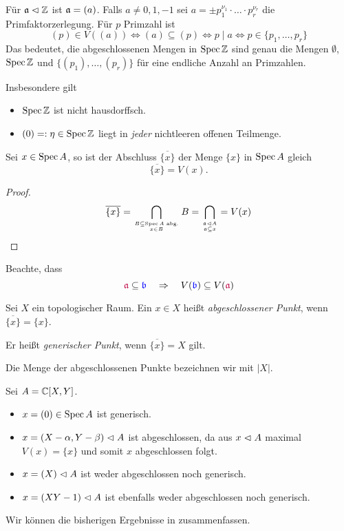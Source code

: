 \begin{beispiel}[$\Spec \Z$]
	Für $\mathfrak{a} \vartriangleleft \mathbb{Z}$ ist $\mathfrak{a} = (a)$. Falls $a \neq 0,1,-1$ sei
	$a = \pm p_1^{\nu_1} \cdot \dots \cdot p_r^{\nu_r}$ die 
	Primfaktorzerlegung. Für $p$ Primzahl ist
	\[
		(p) \in V((a)) \Leftrightarrow
		(a) \subseteq (p) \Leftrightarrow
		p \mid a \Leftrightarrow
		p \in \{p_1,\ldots, p_r\}
	\]
	Das bedeutet, die abgeschlossenen Mengen in $\Spec \Z$ sind genau die 
	Mengen $\emptyset$, $\Spec \Z$ und
	$\{(p_1), \ldots, (p_r)\}$ für eine endliche Anzahl an Primzahlen.
	
	Insbesondere gilt
	\begin{itemize}
	  \item $\Spec\Z$ ist nicht hausdorffsch.
	  \item $(0) =: \eta \in \operatorname{Spec}\mathbb{Z}$ liegt in \emph{jeder} nichtleeren 
	  	offenen Teilmenge.
	\end{itemize}
\end{beispiel}

\begin{lemma}
	Sei $x \in \operatorname{Spec} A$, so ist der Abschluss $\overline{\{x\}}$ der
	Menge $\{x\}$ in $\operatorname{Spec} A$ gleich
	\[\overline{\{x\}} = V(x).\]
\end{lemma}
\begin{proof}
	\[
		\overline{\{x\}} = 
		\bigcap_{B\subseteq \operatorname{Spec} A \text{ abg.}\atop x\in B} B
		= \bigcap_{\mathfrak{a}\vartriangleleft A\atop \mathfrak{a} \subseteq x}
		= V(x)
	\]
\end{proof}

\begin{bemerkung}
	Beachte, dass
	\[
		\textcolor{purple}{\mathfrak{a}} \subseteq \textcolor{blue}{\mathfrak b} \quad 
    \Rightarrow\quad
		V(\textcolor{blue}{\mathfrak b}) \subseteq V(\textcolor{purple}{\mathfrak{a}})
	\]
\end{bemerkung}

\begin{definition}
	Sei $X$ ein topologischer Raum.
	Ein $x\in X$ heißt \emph{abgeschlossener Punkt}, wenn
	$\overline{\{x\}} = \{x\}$.
	
	Er heißt \emph{generischer Punkt}, wenn $\overline{\{x\}} = X$ gilt.
	
	Die Menge der abgeschlossenen Punkte bezeichnen wir mit
	$|X|$.
\end{definition}

\begin{beispiel}
	Sei $A = \mathbb{C}[X,Y]$. 
	\begin{itemize}
	  \item $x = (0) \in \operatorname{Spec} A$ ist generisch.
	  \item $x = (X-\alpha, Y-\beta) \vartriangleleft A$ ist abgeschlossen,
	  	da aus $x \vartriangleleft A$ maximal $V(x) = \{x\}$ und somit $x$ abgeschlossen
	  	folgt.
	  \item $x = (X) \vartriangleleft A$ ist weder abgeschlossen noch generisch.
    \item $x = (XY-1) \vartriangleleft A$ ist ebenfalls weder abgeschlossen noch
      generisch.
	\end{itemize}
  Wir können die bisherigen Ergebnisse in  zusammenfassen. 
\end{beispiel}

